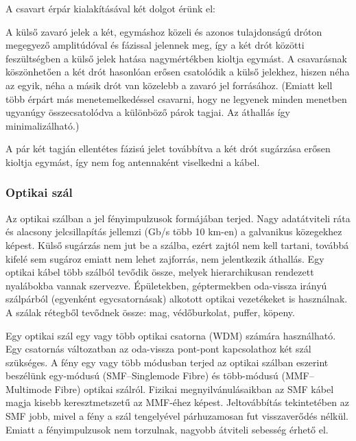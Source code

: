 A csavart érpár kialakításával két dolgot érünk el:
\begin{description}[nosep]
	\item[Zajcsökkentés] A külső zavaró jelek a két, egymáshoz közeli és azonos tulajdonságú dróton megegyező amplitúdóval és fázissal jelennek meg, így a két drót közötti feszültségben a külső jelek hatása nagymértékben kioltja egymást. A csavarásnak köszönhetően a két drót hasonlóan erősen csatolódik a külső jelekhez, hiszen néha az egyik, néha a másik drót van közelebb a zavaró jel forrásához. (Emiatt kell több érpárt más menetemelkedéssel csavarni, hogy ne legyenek minden menetben ugyanúgy összecsatolódva a különböző párok tagjai. Az áthallás így minimalizálható.)
	\item[Vezeték sugárzásának csökkentése] A pár két tagján ellentétes fázisú jelet továbbítva a két drót sugárzása erősen kioltja egymást, így nem fog antennaként viselkedni a kábel.
\end{description}

\subsubsection{Optikai szál}
Az optikai szálban a jel fényimpulzusok formájában terjed. Nagy adatátviteli ráta és alacsony jelcsillapítás jellemzi (Gb/s több 10 km-en) a galvanikus közegekhez képest. Külső sugárzás nem jut be a szálba, ezért zajtól nem kell tartani, továbbá kifelé sem sugároz emiatt nem lehet zajforrás, nem jelentkezik áthallás. Egy optikai kábel több szálból tevődik össze, melyek hierarchikusan rendezett nyalábokba vannak szervezve. Épületekben, géptermekben oda-vissza irányú szálpárból (egyenként egycsatornásak) alkotott optikai vezetékeket is használnak. A szálak rétegből tevődnek össze: mag, védőburkolat, puffer, köpeny.

Egy optikai szál egy vagy több optikai csatorna (WDM) számára használható. Egy csatornás változatban az oda-vissza pont-pont kapcsolathoz két szál szükséges. A fény egy vagy több módusban terjed az optikai szálban eszerint beszélünk egy-módusú (SMF--Singlemode Fibre) és több-módusú (MMF--Multimode Fibre) optikai szálról. Fizikai megnyilvánulásaikban az SMF kábel magja kisebb keresztmetszetű az MMF-éhez képest. Jeltovábbítás tekintetében az SMF jobb, mivel a fény a szál tengelyével párhuzamosan fut visszaverődés nélkül. Emiatt a fényimpulzusok nem torzulnak, nagyobb átviteli sebesség érhető el.

